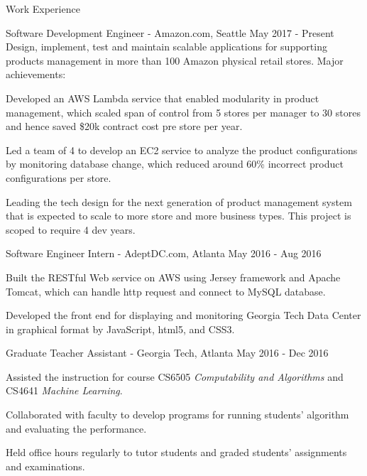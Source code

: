 \documentclass{resume} %
\begin{document}

\begin{rSection}{Work Experience}


	
	
		\begin{rSubsection}{Software Development Engineer{ \normalfont -  Amazon.com, Seattle}} {May 2017 - Present}{} {}
		\setlength{\leftskip}{-1em}	
		Design, implement, test and maintain scalable applications for supporting products management in more than 100 Amazon physical retail stores. Major achievements:\par
	       \setlength{\leftskip}{0em}
	       \item Developed an AWS Lambda service that enabled modularity in product management, which scaled span of control from 5 stores per manager to 30 stores and hence saved \$20k contract cost pre store per year.
	        \item Led a team of 4 to develop an EC2 service to analyze the product configurations by monitoring database change, which reduced around 60\% incorrect product configurations per store.
	        \item Leading the tech design for the next generation of product management system that is expected to scale to more store and more business types. This project is scoped to require 4 dev years.
	\end{rSubsection}
	
	
	

	
	
	\begin{rSubsection}{Software Engineer Intern {\normalfont - AdeptDC.com, Atlanta}} {May  2016 - Aug 2016}
		{} {}		
		\item Built the RESTful Web service on AWS using Jersey framework and Apache Tomcat, which can handle http request and connect to MySQL database.
		\item Developed the front end for displaying and monitoring Georgia Tech Data Center in graphical format by JavaScript, html5, and CSS3.
	\end{rSubsection}
	
	
		\begin{rSubsection}{Graduate Teacher Assistant {\normalfont -  Georgia Tech, Atlanta} }{May 2016 - Dec 2016}{} {}		

    			\item Assisted the instruction for  course CS6505 \textit{Computability and Algorithms} and CS4641 \textit{Machine Learning}.
			\item Collaborated with faculty to develop programs for running students' algorithm and  evaluating the performance.
			\item Held office hours regularly to tutor students and graded students' assignments and examinations.
		\end{rSubsection}	
\end{rSection}
\end{document}
